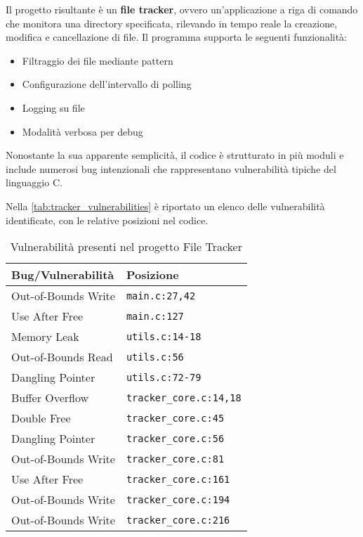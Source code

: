 Il progetto risultante è un \textbf{file tracker}, ovvero un'applicazione a riga
di comando che monitora una directory specificata, rilevando in tempo reale la creazione,
modifica e cancellazione di file. Il programma supporta le seguenti funzionalità:
\begin{itemize}
  \item Filtraggio dei file mediante pattern

  \item Configurazione dell'intervallo di polling

  \item Logging su file

  \item Modalità verbosa per debug
\end{itemize}

Nonostante la sua apparente semplicità, il codice è strutturato in più moduli e
include numerosi bug intenzionali che rappresentano vulnerabilità tipiche del
linguaggio C.

Nella \autoref{tab:tracker_vulnerabilities} è riportato un elenco delle
vulnerabilità identificate, con le relative posizioni nel codice.

\begin{table}[htbp]
  \centering
  \small
  \begin{tabular}{|l|l|}
    \hline
    \textbf{Bug/Vulnerabilità} & \textbf{Posizione}             \\
    \hline
    Out-of-Bounds Write        & \texttt{main.c:27,42}          \\
    \hline
    Use After Free             & \texttt{main.c:127}            \\
    \hline
    Memory Leak                & \texttt{utils.c:14-18}         \\
    \hline
    Out-of-Bounds Read         & \texttt{utils.c:56}            \\
    \hline
    Dangling Pointer           & \texttt{utils.c:72-79}         \\
    \hline
    Buffer Overflow            & \texttt{tracker\_core.c:14,18} \\
    \hline
    Double Free                & \texttt{tracker\_core.c:45}    \\
    \hline
    Dangling Pointer           & \texttt{tracker\_core.c:56}    \\
    \hline
    Out-of-Bounds Write        & \texttt{tracker\_core.c:81}    \\
    \hline
    Use After Free             & \texttt{tracker\_core.c:161}   \\
    \hline
    Out-of-Bounds Write        & \texttt{tracker\_core.c:194}   \\
    \hline
    Out-of-Bounds Write        & \texttt{tracker\_core.c:216}   \\
    \hline
  \end{tabular}
  \caption{Vulnerabilità presenti nel progetto File Tracker}
  \label{tab:tracker_vulnerabilities}
\end{table}

